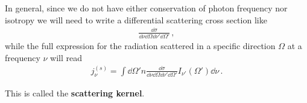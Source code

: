 \documentclass[main.tex]{subfiles}
\begin{document}
In general, since we do not have either conservation of photon frequency nor isotropy we will need to write a differential scattering cross section like 
%
\begin{align}
\frac{ \dd{\sigma }}{ \dd{\nu } \dd{\Omega } \dd{\nu}' \dd{\Omega }'}
\,,
\end{align}
%
while the full expression for the radiation scattered in a specific direction \(\Omega \) at a frequency \(\nu \) will read 
%
\begin{align}
j_\nu^{(s)} = \int \dd{\Omega}' n \frac{ \dd{\sigma }}{ \dd{\nu } \dd{\Omega } \dd{\nu}' \dd{\Omega }'} I_{\nu'} (\Omega') \dd{\nu }
\,. 
\end{align}

This is called the \textbf{scattering kernel}. 
\end{document}
